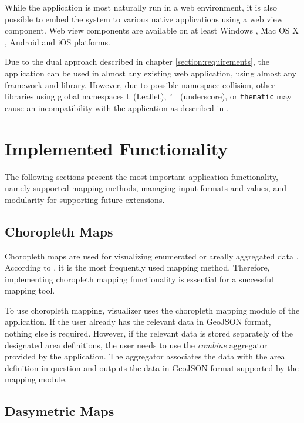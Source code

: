 While the application is most naturally run in a web environment, it is also possible to embed the system to various native applications using a web view component. Web view components are available on at least Windows \citep{small_ten_2012}, Mac OS X \citep{hunter_why_2014}, Android \citep{google_building_2014} and iOS \citep{apple_uiwebview_2014} platforms.

Due to the dual approach described in chapter \ref{section:requirements}, the application can be used in almost any existing web application, using almost any framework and library. However, due to possible namespace collision, other libraries using global namespaces \texttt{L} (Leaflet), \texttt{\char`_} (underscore), or \texttt{thematic} may cause an incompatibility with the application as described in \citet{osmani_essential_2011}.

\section{Implemented Functionality}

The following sections present the most important application functionality, namely supported mapping methods, managing input formats and values, and modularity for supporting future extensions.

\subsection{Choropleth Maps}

Choropleth maps are used for visualizing enumerated or areally aggregated data \citep[chap.~6]{dent_cartography:_2008}. According to \citet[chap.~14]{slocum_thematic_2014}, it is the most frequently used mapping method. Therefore, implementing choropleth mapping functionality is essential for a successful mapping tool.

To use choropleth mapping, visualizer uses the choropleth mapping module of the application. If the user already has the relevant data in GeoJSON format, nothing else is required. However, if the relevant data is stored separately of the designated area definitions, the user needs to use the \emph{combine} aggregator provided by the application. The aggregator associates the data with the area definition in question and outputs the data in GeoJSON format supported by the mapping module.


\subsection{Dasymetric Maps}

